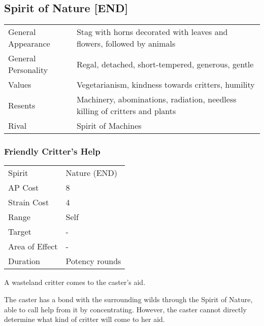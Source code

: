 \documentclass[11pt,a4paper,twocolumn]{book}
\begin{document}
\subsection*{Spirit of Nature [END]}
{
	\begin{tabu} to 75mm{| X[l,4] | X[l,8] |}
		\hline
		General Appearance  & Stag with horns decorated with leaves and flowers, followed by animals      \\
		General Personality & Regal, detached, short-tempered, generous, gentle                           \\
		Values              & Vegetarianism, kindness towards critters, humility                          \\
		Resents             & Machinery, abominations, radiation, needless killing of critters and plants \\
		Rival               & Spirit of Machines                                                          \\ \hline
	\end{tabu}
	
}
\medskip

\subsubsection*{Friendly Critter's Help}
{
	\begin{tabu} to 75mm{| X[l,4] | X[l,7] |}
		\hline
		Spirit 			& Nature (END) 		\\
		AP Cost	      	& 8						\\
		Strain Cost     & 4 					\\
		Range     		& Self 					\\
		Target      	& -						\\
		Area of Effect  & -  	 				\\
		Duration     	& Potency rounds 		\\ \hline
	\end{tabu}
	
}

\medskip

A wasteland critter comes to the caster's aid.

The caster has a bond with the surrounding wilds through the Spirit of Nature, able to call help from it by concentrating. However, the caster cannot directly determine what kind of critter will come to her aid.
\end{document}
